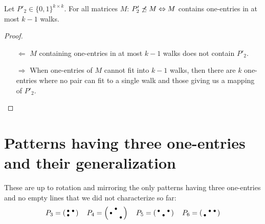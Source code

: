\begin{thm}
Let $P'_2\in\{0,1\}^{k\times k}$. For all matrices $M$: $P'_2\not\preceq M\Leftrightarrow M$ contains one-entries in at most $k-1$ walks.
\end{thm}
\begin{proof}
\begin{itemize}
	\item[$\Leftarrow$] $M$ containing one-entries in at most $k-1$ walks does not contain $P'_2$.
	\item[$\Rightarrow$] When one-entries of $M$ cannot fit into $k-1$ walks, then there are $k$ one-entries where no pair can fit to a single walk and those giving us a mapping of $P'_2$.
\end{itemize}
\end{proof}

\section{Patterns having three one-entries and their generalization}
\label{sec:3ones}
These are up to rotation and mirroring the only patterns having three one-entries and no empty lines that we did not characterize so far:
$$P_3=\left(\begin{smallmatrix}\bullet&\bullet\\\bullet& \end{smallmatrix}\right)\ \ \ P_4=\left(\begin{smallmatrix} &\bullet& \\\bullet& & \\ & &\bullet\end{smallmatrix}\right)\ \ \ P_5=\left(\begin{smallmatrix}\bullet& &\bullet\\ &\bullet& \end{smallmatrix}\right)\ \ \ P_6=\left(\begin{smallmatrix} &\bullet&\bullet\\\bullet& & \end{smallmatrix}\right)$$

